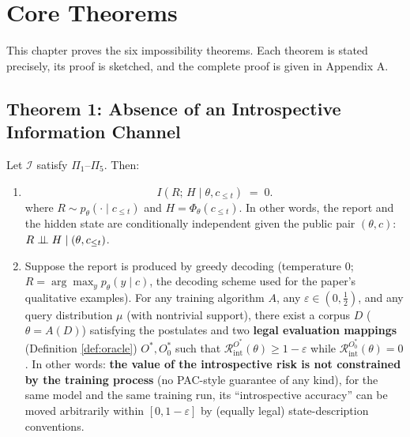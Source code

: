 \section{Core Theorems}

This chapter proves the six impossibility theorems. Each theorem is stated precisely, its
proof is sketched, and the complete proof is given in Appendix A.

\subsection{Theorem 1: Absence of an Introspective Information Channel}

\begin{theorem}\label{thm:info-gap}
Let $\mathcal{I}$ satisfy $\Pi_1$--$\Pi_5$. Then:

\begin{enumerate}[align=left, labelwidth=!, labelsep=0.8em, leftmargin=!, itemindent=0pt]
\item[(\textbf{1a})\textbf{Zero mutual information in the native regime}]
\begin{equation}
I\!\left(R;\, H \mid \theta, c_{\le t}\right) \;=\; 0 .
\label{eq:thm1a}
\end{equation}
where $R \sim p_\theta(\cdot \mid c_{\le t})$ and $H = \Phi_\theta(c_{\le t})$.
In other words, the report and the hidden state are conditionally independent given the
public pair
$(\theta, c)$: $R \perp\!\!\!\perp H \mid (\theta, c_{\le t})$.
\item[(\textbf{1b})\textbf{No PAC guarantee for introspective accuracy}] Suppose the report is
produced by greedy decoding (temperature $0$; $R = \arg\max_y p_\theta(y\mid c)$, the decoding
scheme used for the paper's qualitative examples). For any training algorithm $A$, any
$\varepsilon \in (0, \tfrac12)$, and any query distribution $\mu$ (with nontrivial support),
there exist a corpus $D$ ($\theta = A(D)$) satisfying the postulates and two \textbf{legal
evaluation mappings} (Definition \ref{def:oracle}) $O^{*}, O^{*}_0$ such that
$\mathcal{R}_{\mathrm{int}}^{O^{*}}(\theta) \ge 1 - \varepsilon$ while
$\mathcal{R}_{\mathrm{int}}^{O^{*}_0}(\theta) = 0$.
In other words: \textbf{the value of the introspective risk is not constrained by the
training
process} (no PAC-style guarantee of any kind), for the same model and the same training
run, its ``introspective accuracy'' can be moved arbitrarily within $[0, 1-\varepsilon]$ by
(equally legal) state-description conventions.
\end{enumerate}
\end{theorem}

